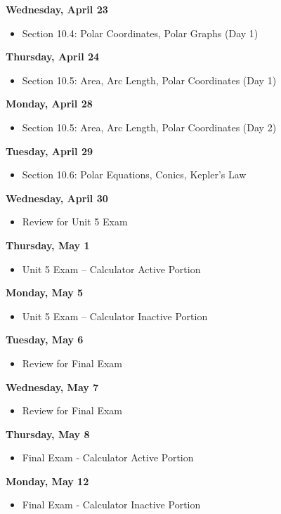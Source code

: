 \documentclass[11pt]{article}
\begin{document}
\textbf{Wednesday, April 23}

\begin{itemize}
\item Section 10.4: Polar Coordinates, Polar Graphs (Day 1)
\end{itemize}

\textbf{Thursday, April 24}

\begin{itemize}
\item Section 10.5: Area, Arc Length, Polar Coordinates (Day 1)
\end{itemize}

\textbf{Monday, April 28}

\begin{itemize}
\item Section 10.5: Area, Arc Length, Polar Coordinates (Day 2)
\end{itemize}

\textbf{Tuesday, April 29}

\begin{itemize}
\item Section 10.6: Polar Equations, Conics, Kepler's Law
\end{itemize}

\textbf{Wednesday, April 30}

\begin{itemize}
\item Review for Unit 5 Exam
\end{itemize}

\textbf{Thursday, May 1}

\begin{itemize}
\item Unit 5 Exam -- Calculator Active Portion
\end{itemize}

\textbf{Monday, May 5}

\begin{itemize}
\item Unit 5 Exam -- Calculator Inactive Portion
\end{itemize}

\textbf{Tuesday, May 6}

\begin{itemize}
\item Review for Final Exam
\end{itemize}

\textbf{Wednesday, May 7}

\begin{itemize}
\item Review for Final Exam
\end{itemize}

\textbf{Thursday, May 8}

\begin{itemize}
\item Final Exam - Calculator Active Portion
\end{itemize}

\textbf{Monday, May 12}

\begin{itemize}
\item Final Exam - Calculator Inactive Portion
\end{itemize}
\end{document}
